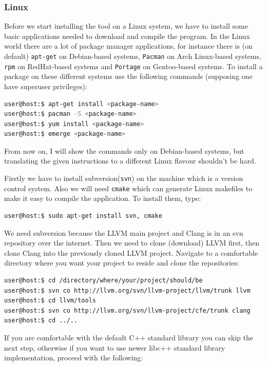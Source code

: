 \subsubsection{Linux}\label{linux}
\par Before we start installing the tool on a Linux system, we have to install some basic applications needed to download and compile the program. In the Linux world there are a lot of package manager applications, for instance there is (on default) \verb|apt-get| on Debian-based systems, \verb|Pacman| on Arch Linux-based systems, \verb|rpm| on RedHat-based systems and \verb|Portage| on Gentoo-based systems. To install a package on these different systems use the following commands (supposing one have superuser privileges):
\begin{lstlisting}[language=bash, frame=single]
user@host:$ apt-get install <package-name>
user@host:$ pacman -S <package-name>
user@host:$ yum install <package-name>
user@host:$ emerge <package-name>
\end{lstlisting}
\par From now on, I will show the commands only on Debian-based systems, but translating the given instructions to a different Linux flavour shouldn't be hard. \medskip 
\par Firstly we have to install subversion(\verb|svn|) on the machine which is a version control system. Also we will need \verb|cmake| which can generate Linux makefiles to make it easy to compile the application. To install them, type:
\begin{lstlisting}[language=bash, frame=single]
user@host:$ sudo apt-get install svn, cmake
\end{lstlisting}
\par We need subversion because the LLVM main project and Clang is in an svn repository over the internet. Then we need to clone (download) LLVM first, then clone Clang into the previously cloned LLVM project. Navigate to a comfortable directory where you want your project to reside and clone the repositories:
\begin{lstlisting}[language=bash, frame=single]
user@host:$ cd /directory/where/your/project/should/be
user@host:$ svn co http://llvm.org/svn/llvm-project/llvm/trunk llvm
user@host:$ cd llvm/tools
user@host:$ svn co http://llvm.org/svn/llvm-project/cfe/trunk clang
user@host:$ cd ../..
\end{lstlisting}
\par If you are comfortable with the default C++ standard library you can skip the next step, otherwise if you want to use newer libc++ standard library implementation, proceed with the following:
